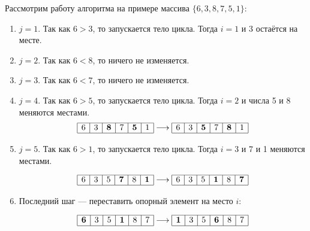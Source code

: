 \documentclass[a4paper,12pt]{article}
\begin{document}
Рассмотрим работу алгоритма на примере массива $\{6, 3, 8, 7, 5 ,1\}$:
\begin{enumerate}
	\item $j = 1$. Так как $6 > 3$, то запускается тело цикла. Тогда $i = 1$ и 3 остаётся на месте.
	
	\item $j = 2$. Так как $6 < 8$, то ничего не изменяется.
	
	\item $j = 3$. Так как $6 < 7$, то ничего не изменяется.
	
	\item $j = 4$. Так как $6 > 5$, то запускается тело цикла. Тогда $i = 2$ и числа 5 и 8 меняются местами.
	\[\begin{array}{|c|c|c|c|c|c|}
	\hline 6 & 3 & \textbf{8} & 7 & \textbf{5} & 1 \\
	\hline
	\end{array}
	\longrightarrow
	\begin{array}{|c|c|c|c|c|c|}
	\hline 6 & 3 & \textbf{5} & 7 & \textbf{8} & 1 \\
	\hline
	\end{array}\]
	
	\item $j = 5$. Так как $6 > 1$, то запускается тело цикла. Тогда $i = 3$ и 7 и 1 меняются местами.
	
	\[\begin{array}{|c|c|c|c|c|c|}
	\hline 6 & 3 & 5 & \textbf{7} & 8 & \textbf{1} \\
	\hline
	\end{array}
	\longrightarrow
	\begin{array}{|c|c|c|c|c|c|}
	\hline 6 & 3 & 5 & \textbf{1} & 8 & \textbf{7} \\
	\hline
	\end{array}\]
	
	\item Последний шаг --- переставить опорный элемент на место $i$:
	
	\[\begin{array}{|c|c|c|c|c|c|}
	\hline \textbf{6} & 3 & 5 & \textbf{1} & 8 & 7 \\
	\hline
	\end{array}
	\longrightarrow
	\begin{array}{|c|c|c|c|c|c|}
	\hline \textbf{1} & 3 & 5 & \textbf{6} & 8 & 7 \\
	\hline
	\end{array}\]
\end{enumerate}
\end{document}
